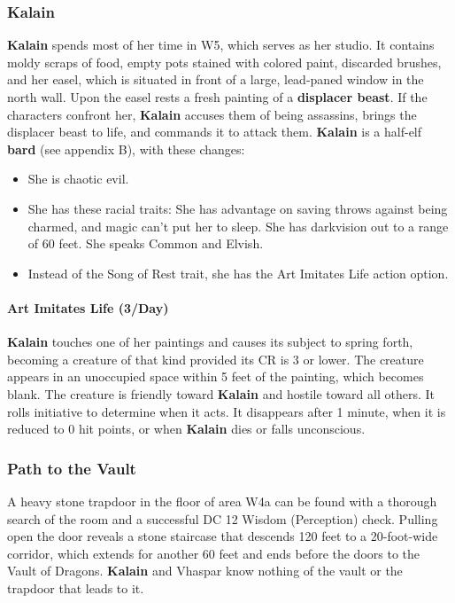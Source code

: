 \documentclass[10pt,a4paper,twoside,twocolumn,openany,nodeprecatedcode]{dndbook}
\begin{document}
\subsubsection{Kalain}
\textbf{Kalain} spends most of her time in W5, which serves as her studio. It contains moldy scraps of food, empty pots stained with colored paint, discarded brushes, and her easel, which is situated in front of a large, lead-paned window in the north wall. Upon the easel rests a fresh painting of a \textbf{displacer beast}. If the characters confront her, \textbf{Kalain} accuses them of being assassins, brings the displacer beast to life, and commands it to attack them.
\textbf{Kalain} is a half-elf \textbf{bard} (see appendix B), with these changes:
\begin{itemize}

\item She is chaotic evil.
\item She has these racial traits: She has advantage on saving throws against being charmed, and magic can't put her to sleep. She has darkvision out to a range of 60 feet. She speaks Common and Elvish.
\item Instead of the Song of Rest trait, she has the Art Imitates Life action option.
\end{itemize}


\paragraph{Art Imitates Life (3/Day)}
\textbf{Kalain} touches one of her paintings and causes its subject to spring forth, becoming a creature of that kind provided its CR is 3 or lower. The creature appears in an unoccupied space within 5 feet of the painting, which becomes blank. The creature is friendly toward \textbf{Kalain} and hostile toward all others. It rolls initiative to determine when it acts. It disappears after 1 minute, when it is reduced to 0 hit points, or when \textbf{Kalain} dies or falls unconscious.
\subsubsection{Path to the Vault}
A heavy stone trapdoor in the floor of area W4a can be found with a thorough search of the room and a successful DC 12 Wisdom (Perception) check. Pulling open the door reveals a stone staircase that descends 120 feet to a 20-foot-wide corridor, which extends for another 60 feet and ends before the doors to the Vault of Dragons. \textbf{Kalain} and Vhaspar know nothing of the vault or the trapdoor that leads to it.
\end{document}

